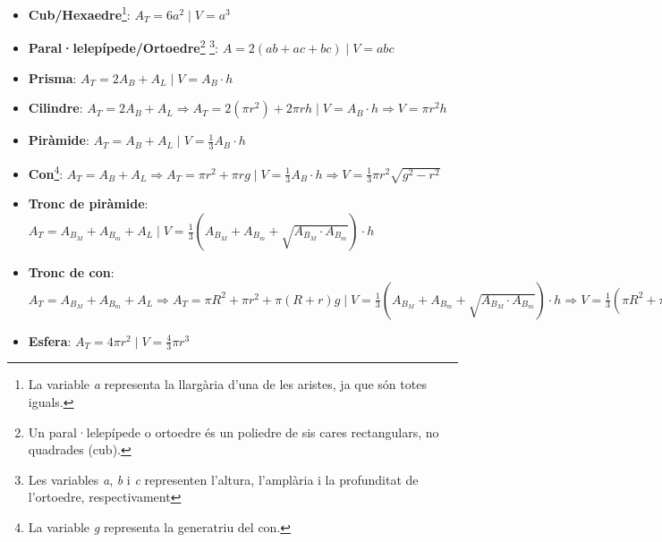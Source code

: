\documentclass[12pt,a4paper]{article}
\begin{document}
\begin{itemize}
	\item \textbf{Cub/Hexaedre}\footnote{La variable \textit{a} representa la llargària d'una de les aristes, ja que són totes iguals.}: \(A_T=6a^2 \mid V=a^3\)
	\item \textbf{Paral·lelepípede/Ortoedre}\footnote{Un paral·lelepípede o ortoedre és un poliedre de sis cares rectangulars, no quadrades (cub).} \footnote{Les variables \textit{a}, \textit{b} i \textit{c} representen l'altura, l'amplària i la profunditat de l'ortoedre, respectivament}: \(A=2(ab+ac+bc) \mid V=abc\)
	\item \textbf{Prisma}: \(A_T=2A_B+A_L \mid V=A_B \cdot h\)
	\item \textbf{Cilindre}: \(A_T=2A_B+A_L \Rightarrow A_T=2(\pi r^2)+2\pi rh \mid V=A_B \cdot h \Rightarrow V=\pi r^2h\)
	\item \textbf{Piràmide}: \(A_T=A_B+A_L \mid V=\frac{1}{3}A_B \cdot h\)
	\item \textbf{Con}\footnote{La variable \textit{g} representa la generatriu del con.}: \(A_T=A_B+A_L \Rightarrow A_T=\pi r^2+\pi rg \mid V=\frac{1}{3}A_B \cdot h \Rightarrow V=\frac{1}{3}\pi r^2\sqrt{g^2-r^2}\)
	\item \textbf{Tronc de piràmide}: \(A_T=A_{B_M}+A_{B_m}+A_L \mid V=\frac{1}{3}(A_{B_M}+A_{B_m}+ \sqrt{A_{B_M} \cdot A_{B_m}}) \cdot h\)
	\item \textbf{Tronc de con}: \(A_T=A_{B_M}+A_{B_m}+A_L \Rightarrow A_T=\pi R^2+\pi r^2+\pi(R+r)g \mid V=\frac{1}{3}(A_{B_M}+A_{B_m}+\sqrt{A_{B_M} \cdot A_{B_m}}) \cdot h \Rightarrow V=\frac{1}{3}(\pi R^2+\pi r^2+\sqrt{2\pi(R \cdot r)^2}) \cdot \sqrt{g^2-(R-r)^2}\)
	\item \textbf{Esfera}: \(A_T=4\pi r^2 \mid V=\frac{4}{3}\pi r^3\)
\end{itemize}
\end{document}

